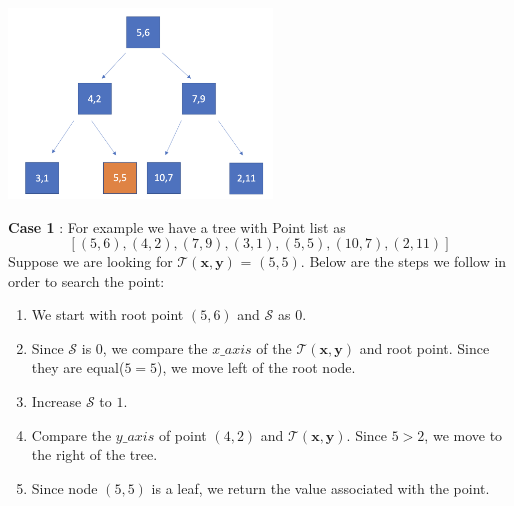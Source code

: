 \begin{mscexample}
    \begin{minipage}[t]{\linewidth}
        \centering
        \includegraphics[width=7cm]{graphs/KD_Tree_Point_Query_Tree.png}
        \label{fig:$K$D-Tree_for_Point Query}
    \end{minipage}
    
    \textbf{Case 1} : For example we have a tree with Point list as 
	$$[(5,6),(4,2),(7,9),(3,1),(5,5),(10,7),(2,11)]$$
    Suppose we are looking for $\mathcal{T}(\boldsymbol{x}, \boldsymbol{y})$ = $(5,5)$.
    Below are the steps we follow in order to search the point:
    \begin{enumerate}
         \item We start with root point $(5,6)$ and $\mathcal{S}$ as $0$. 
         
         \item Since $\mathcal{S}$ is $0$, we compare the $x\_axis$ of the $\mathcal{T}(\boldsymbol{x}, \boldsymbol{y})$ and root point. Since they are equal($5 = 5$), we move left of the root node. 
         
         \item Increase $\mathcal{S}$ to $1$. 
         
         \item Compare the $y\_axis$ of point $(4,2)$ and  $\mathcal{T}(\boldsymbol{x}, \boldsymbol{y})$. Since $5 > 2$, we move to the right of the tree. 
         
         \item Since node $(5,5)$ is a leaf, we return the value associated with the point. 
    \end{enumerate}
\end{mscexample}
